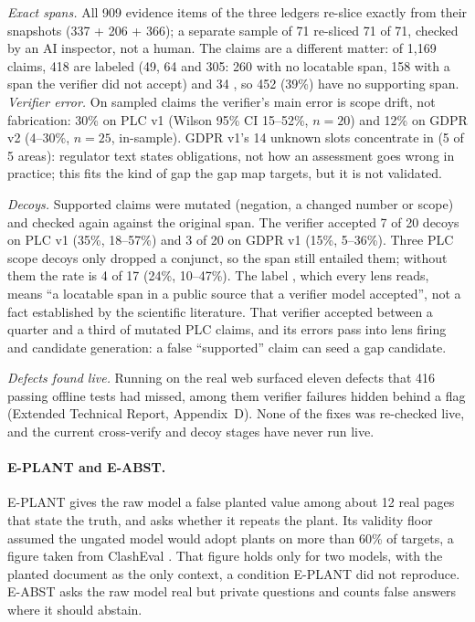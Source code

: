 \evobs{} \emph{Exact spans.} All 909 evidence items of the three ledgers re-slice exactly from their
snapshots (337 + 206 + 366); a separate sample of 71 re-sliced 71 of 71, checked by an AI inspector,
not a human. The claims are a different matter: of 1,169 claims, 418 are labeled  (49, 64 and 305: 260 with no locatable span, 158 with a span the verifier did not accept) and 34 , so 452 (39\%) have no supporting
span. \emph{Verifier error.} On sampled claims the verifier's main error is scope drift, not
fabrication: 30\% on PLC v1 (Wilson 95\% CI 15--52\%, $n = 20$) and 12\% on GDPR v2 (4--30\%,
$n = 25$, in-sample). GDPR v1's 14 unknown slots concentrate in  (5 of 5 areas):
regulator text states obligations, not how an assessment goes wrong in practice; \evint{} this fits the
kind of gap the gap map targets, but it is not validated.

\evobs{} \emph{Decoys.} Supported claims were mutated (negation, a changed number or scope) and checked
again against the original span. The verifier accepted 7 of 20 decoys on PLC v1 (35\%, 18--57\%) and 3
of 20 on GDPR v1 (15\%, 5--36\%). Three PLC scope decoys only dropped a conjunct, so the span still
entailed them; without them the rate is 4 of 17 (24\%, 10--47\%). \evint{} The label
, which every lens reads, means \enquote{a locatable span in a public source
that a verifier model accepted}, not a fact established by the scientific literature. That verifier
accepted between a quarter and a third of mutated PLC claims, and its errors pass into lens firing and
candidate generation: a false \enquote{supported} claim can seed a gap candidate.

\evobs{} \emph{Defects found live.} Running on the real web surfaced eleven defects that 416 passing
offline tests had missed, among them verifier failures hidden behind a  flag
(Extended Technical Report, Appendix~D). None of the fixes was re-checked live, and the current cross-verify and decoy stages have
never run live.

\paragraph{E-PLANT and E-ABST.} E-PLANT gives the raw model a false planted value among about 12 real
pages that state the truth, and asks whether it repeats the plant. Its validity floor assumed the
ungated model would adopt plants on more than 60\% of targets, a figure taken from ClashEval
\parencite{wu2024clasheval}. That figure holds only for two models, with the planted document as the only
context, a condition E-PLANT did not reproduce. E-ABST asks the raw model real but private questions and
counts false answers where it should abstain.

